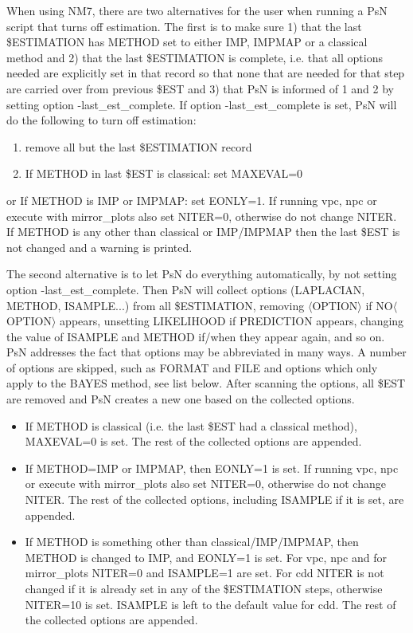 When using NM7, there are two alternatives for the user when running a PsN script that turns off estimation. The first is to make sure 1) that the last \$ESTIMATION has METHOD set to either IMP, IMPMAP or a classical method and 2) that the last \$ESTIMATION is complete, i.e. that all options needed are explicitly set in that record so that none that are needed for that step are carried over from previous \$EST and 3) that PsN is informed of 1 and 2 by setting option -last\_est\_complete. If option -last\_est\_complete is set, PsN will do the following to turn off estimation: 
\begin{enumerate}
	\item remove all but the last \$ESTIMATION record 
	\item If METHOD in last \$EST is classical: set MAXEVAL=0 
\end{enumerate}
or 
If METHOD is IMP or IMPMAP: set EONLY=1. If running vpc, npc or execute with 
mirror\_plots also set NITER=0, otherwise do not change NITER.
If METHOD is any other than classical or IMP/IMPMAP then the last \$EST is not changed and a warning is printed.

The second alternative is to let PsN do everything automatically, by not setting option -last\_est\_complete. Then PsN will collect options (LAPLACIAN, METHOD, ISAMPLE...) from all \$ESTIMATION, removing $\langle$OPTION$\rangle$ if NO$\langle$OPTION$\rangle$ appears, unsetting LIKELIHOOD if PREDICTION appears, changing the value of ISAMPLE and METHOD if/when they appear again, and so on. PsN addresses the fact that options may be abbreviated in many ways. A number of options are skipped, such as FORMAT and FILE and options which only apply to the BAYES method, see list below. After scanning the options, all \$EST are removed and PsN creates a new one based on the collected options. 

\begin{itemize}
	\item If METHOD is classical (i.e. the last \$EST had a classical method), MAXEVAL=0 is set. The rest of the collected options are appended.
	\item If METHOD=IMP or IMPMAP, then EONLY=1 is set. If running vpc, npc or execute with mirror\_plots also set NITER=0, otherwise do not change NITER. The rest of the collected options, including ISAMPLE if it is set, are appended. 
	\item If METHOD is something other than classical/IMP/IMPMAP, then METHOD is changed to IMP, and EONLY=1 is set. For vpc, npc and for mirror\_plots NITER=0 and ISAMPLE=1 are set. For cdd NITER is not changed if it is already set in any of the \$ESTIMATION steps, otherwise NITER=10 is set. ISAMPLE is left to the default value for cdd. The rest of the collected options are appended.
\end{itemize}

